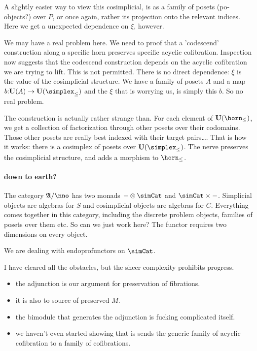 \documentclass[csh.tex]{subfiles}
\begin{document}
A slightly easier way to view this cosimplicial, is as a family of posets (po-objects?) over $P$, or once again, rather its projection onto the relevant indices. Here we get a unexpected dependence on $\xi$, however.

We may have a real problem here. We need to proof that a 'codescend' construction along a specific horn preserves specific acyclic cofibration. Inspection now suggests that the codescend construction depends on the acyclic cofibration we are trying to lift. This is not permitted.
There is no direct dependence: $\xi$ is the value of the cosimplicial structure. We have a family of posets $A$ and a map $b\of\base(A)\to\base(\simplex_\leq)$ and the $\xi$ that is worrying us, is simply this $b$. So no real problem.

The construction is actually rather strange than. For each element of $\base(\horn_\leq)$, we get a collection of factorization through other posets over their codomains. Those other posets are really best indexed with their target pairs\dots.
That is how it works: there is a cosimplex of posets over $\base(\simplex_\leq)$. The nerve preserves the cosimplicial structure, and adds a morphism to $\horn_\leq$. 

\paragraph{down to earth?}
The category $\ambient/\nno$ has two monads $-\otimes\simCat$ and $\simCat\times-$. Simplicial objects are algebras for $S$ and cosimplicial objects are algebras for $C$. Everything comes together in this category, including the discrete problem objects, families of posets over them etc. So can we just work here? The functor requires two dimensions on every object.

We are dealing with endoprofunctors on $\simCat$.

I have cleared all the obstacles, but the sheer complexity prohibits progress.

\begin{itemize}
\item the adjunction is our argument for preservation of fibrations.
\item it is also to source of preserved $M$.
\item the bimodule that generates the adjunction is fucking complicated itself.
\item we haven't even started showing that is sends the generic family of acyclic cofibration to a family of cofibrations.
\end{itemize}
\end{document}
